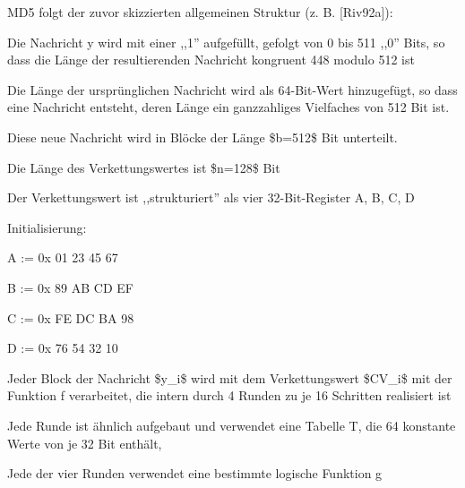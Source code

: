 \documentclass[a4paper]{article}
\begin{document}
\begin{multicols}{3}
      \begin{itemize*}
            \item
            MD5 folgt der zuvor skizzierten allgemeinen Struktur (z. B.
            {[}Riv92a{]}):

            \begin{itemize*}
                  \item Die Nachricht y wird mit einer ,,1'' aufgefüllt, gefolgt von 0 bis 511 ,,0'' Bits, so dass die Länge der resultierenden Nachricht kongruent 448 modulo 512 ist
                  \item Die Länge der ursprünglichen Nachricht wird als 64-Bit-Wert hinzugefügt, so dass eine Nachricht entsteht, deren Länge ein ganzzahliges Vielfaches von 512 Bit ist.
                  \item Diese neue Nachricht wird in Blöcke der Länge \$b=512\$ Bit unterteilt.
                  \item Die Länge des Verkettungswertes ist \$n=128\$ Bit
                  \begin{itemize*} \item Der Verkettungswert ist ,,strukturiert'' als vier 32-Bit-Register A, B, C, D \item Initialisierung:
                        \begin{itemize*} \item A := 0x 01 23 45 67 \item B := 0x 89 AB CD EF \item C := 0x FE DC BA 98 \item D := 0x 76 54 32 10 \end{itemize*} \end{itemize*}
                  \item Jeder Block der Nachricht \$y\_i\$ wird mit dem Verkettungswert \$CV\_i\$ mit der Funktion f verarbeitet, die intern durch 4 Runden zu je 16 Schritten realisiert ist
                  \begin{itemize*} \item Jede Runde ist ähnlich aufgebaut und verwendet eine Tabelle T, die 64 konstante Werte von je 32 Bit enthält, \item Jede der vier Runden verwendet eine bestimmte logische Funktion g \end{itemize*}
            \end{itemize*}


\end{itemize*}
\end{multicols}
\end{document}
